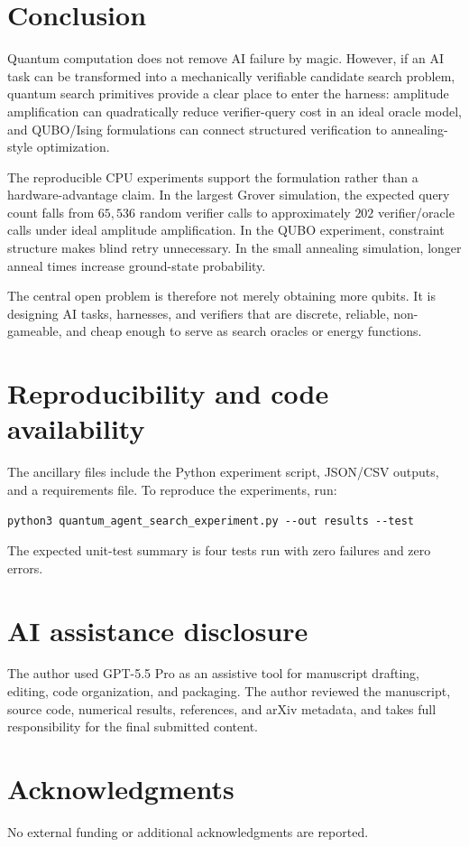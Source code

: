\documentclass[11pt]{article}
\begin{document}
\section{Conclusion}

Quantum computation does not remove AI failure by magic. However, if an AI task can be transformed into a mechanically verifiable candidate search problem, quantum search primitives provide a clear place to enter the harness: amplitude amplification can quadratically reduce verifier-query cost in an ideal oracle model, and QUBO/Ising formulations can connect structured verification to annealing-style optimization.

The reproducible CPU experiments support the formulation rather than a hardware-advantage claim. In the largest Grover simulation, the expected query count falls from $65{,}536$ random verifier calls to approximately $202$ verifier/oracle calls under ideal amplitude amplification. In the QUBO experiment, constraint structure makes blind retry unnecessary. In the small annealing simulation, longer anneal times increase ground-state probability.

The central open problem is therefore not merely obtaining more qubits. It is designing AI tasks, harnesses, and verifiers that are discrete, reliable, non-gameable, and cheap enough to serve as search oracles or energy functions.

\section*{Reproducibility and code availability}

The ancillary files include the Python experiment script, JSON/CSV outputs, and a requirements file. To reproduce the experiments, run:
\begin{verbatim}
python3 quantum_agent_search_experiment.py --out results --test
\end{verbatim}
The expected unit-test summary is four tests run with zero failures and zero errors.

\section*{AI assistance disclosure}

The author used GPT-5.5 Pro as an assistive tool for manuscript drafting, editing, code organization, and packaging. The author reviewed the manuscript, source code, numerical results, references, and arXiv metadata, and takes full responsibility for the final submitted content.

\section*{Acknowledgments}

No external funding or additional acknowledgments are reported.



\end{document}
